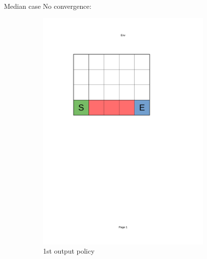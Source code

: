 \documentclass[10pt]{beamer}
\begin{document}
\begin{frame}{Median case}
    No convergence:

    \begin{figure}[!ht]
        \centering
        \begin{subfigure}{0.24\textwidth}
            \centering
                \includegraphics[page=8, trim = 40mm 160mm 70mm 45mm, clip, width=0.95\textwidth]{figures/personal_work/policies.pdf}
            \caption{1st output policy}
        \end{subfigure}
        \begin{subfigure}{0.24\textwidth}
            \centering

\end{subfigure}
\end{figure}
\end{frame}
\end{document}
